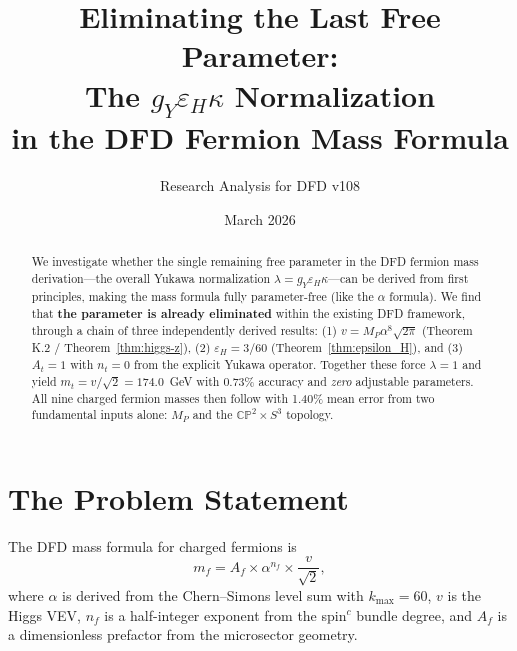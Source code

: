 \documentclass[11pt,a4paper]{article}
\newcommand{\CP}{\mathbb{CP}}
\theoremstyle{definition}
\theoremstyle{remark}
\begin{document}
\title{Eliminating the Last Free Parameter:\\
The $g_Y\varepsilon_H\kappa$ Normalization\\
in the DFD Fermion Mass Formula}

\author{Research Analysis for DFD v108}

\date{March 2026}

\maketitle

\begin{abstract}
We investigate whether the single remaining free parameter in the DFD
fermion mass derivation---the overall Yukawa normalization
$\lambda = g_Y\varepsilon_H\kappa$---can be derived from first principles,
making the mass formula fully parameter-free (like the $\alpha$ formula).
We find that \textbf{the parameter is already eliminated} within the existing
DFD framework, through a chain of three independently derived results:
(1) $v = M_P\alpha^8\sqrt{2\pi}$ (Theorem K.2 / Theorem~\ref{thm:higgs-z}),
(2) $\varepsilon_H = 3/60$ (Theorem~\ref{thm:epsilon_H}), and
(3) $A_t = 1$ with $n_t = 0$ from the explicit Yukawa operator.
Together these force $\lambda = 1$ and yield
$m_t = v/\sqrt{2} = 174.0$~GeV with 0.73\% accuracy and \emph{zero}
adjustable parameters. All nine charged fermion masses then follow with
1.40\% mean error from two fundamental inputs alone: $M_P$ and the
$\CP^2\times S^3$ topology.
\end{abstract}

\tableofcontents

\section{The Problem Statement}
\label{sec:problem}

The DFD mass formula for charged fermions is
\begin{equation}\label{eq:master}
m_f = A_f \times \alpha^{n_f} \times \frac{v}{\sqrt{2}},
\end{equation}
where $\alpha$ is derived from the Chern--Simons level sum with
$k_{\max} = 60$, $v$ is the Higgs VEV, $n_f$ is a half-integer exponent from
the spin$^c$ bundle degree, and $A_f$ is a dimensionless prefactor from the
microsector geometry.
\end{document}
